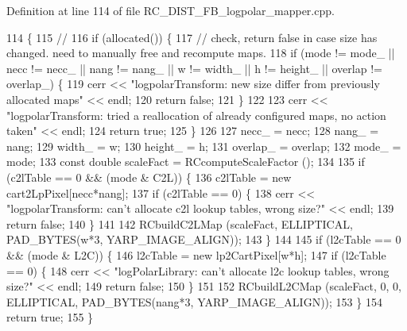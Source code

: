 Definition at line 114 of file R\+C\+\_\+\+D\+I\+S\+T\+\_\+\+F\+B\+\_\+logpolar\+\_\+mapper.\+cpp.


\begin{DoxyCode}
114                                                                                                     \{
115     \textcolor{comment}{//}
116     \textcolor{keywordflow}{if} (allocated()) \{
117         \textcolor{comment}{// check, return false in case size has changed. need to manually free and recompute maps.}
118         \textcolor{keywordflow}{if} (mode != mode\_ || necc != necc\_ || nang != nang\_ || w != width\_ || h != height\_ || 
      overlap != overlap\_) \{
119             cerr << \textcolor{stringliteral}{"logpolarTransform: new size differ from previously allocated maps"} << endl;
120             \textcolor{keywordflow}{return} \textcolor{keyword}{false};
121         \}
122 
123         cerr << \textcolor{stringliteral}{"logpolarTransform: tried a reallocation of already configured maps, no action taken"} << 
      endl;
124         \textcolor{keywordflow}{return} \textcolor{keyword}{true};
125     \}
126 
127     necc\_ = necc;
128     nang\_ = nang;
129     width\_ = w;
130     height\_ = h;
131     overlap\_ = overlap;
132     mode\_ = mode;
133     \textcolor{keyword}{const} \textcolor{keywordtype}{double} scaleFact = RCcomputeScaleFactor ();    
134     
135     \textcolor{keywordflow}{if} (c2lTable == 0 && (mode & C2L)) \{
136         c2lTable = \textcolor{keyword}{new} cart2LpPixel[necc*nang];
137         \textcolor{keywordflow}{if} (c2lTable == 0) \{
138             cerr << \textcolor{stringliteral}{"logpolarTransform: can't allocate c2l lookup tables, wrong size?"} << endl;
139             \textcolor{keywordflow}{return} \textcolor{keyword}{false};
140         \}
141 
142         RCbuildC2LMap (scaleFact, ELLIPTICAL, PAD\_BYTES(w*3, YARP\_IMAGE\_ALIGN));
143     \}
144 
145     \textcolor{keywordflow}{if} (l2cTable == 0 && (mode & L2C)) \{
146         l2cTable = \textcolor{keyword}{new} lp2CartPixel[w*h];
147         \textcolor{keywordflow}{if} (l2cTable == 0) \{
148             cerr << \textcolor{stringliteral}{"logPolarLibrary: can't allocate l2c lookup tables, wrong size?"} << endl;
149             \textcolor{keywordflow}{return} \textcolor{keyword}{false};
150         \}
151 
152         RCbuildL2CMap (scaleFact, 0, 0, ELLIPTICAL, PAD\_BYTES(nang*3, YARP\_IMAGE\_ALIGN));
153     \}
154     \textcolor{keywordflow}{return} \textcolor{keyword}{true};
155 \}
\end{DoxyCode}
